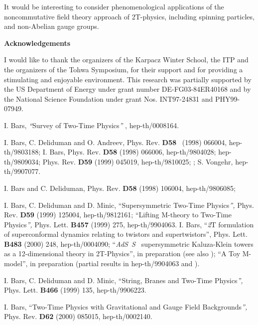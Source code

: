 \documentclass[a4paper,12pt]{article}
\begin{document}
It would be interesting to consider phenomenological applications of the
noncommutative field theory approach of 2T-physics, including spinning
particles, and non-Abelian gauge groups.

\bigskip

{\bf Acknowledgements}
\medskip

I would like to thank the organizers of the Karpacz Winter School,
the ITP and the organizers of the Tohwa Symposium, for their
support and for providing a stimulating and enjoyable environment.
This research was partially supported by the US Department of
Energy under grant number DE-FG03-84ER40168 and by the National
Science Foundation under grant Nos. INT97-24831 and PHY99-07949.

\begin{thebibliography}{99}
  I. Bars, \textit{``}Survey of Two-Time Physics\textit{''}
, hep-th/0008164.

  I. Bars, C. Deliduman and O. Andreev, Phys. Rev. \textbf{D58%
} \ (1998) 066004, hep-th/9803188; I. Bars, Phys. Rev.
\textbf{D58} (1998) 066006, hep-th/9804028; hep-th/9809034; Phys.
Rev. \textbf{D59} (1999) 045019, hep-th/9810025; ; S. Vongehr,
hep-th/9907077.

  I. Bars and C. Deliduman, Phys. Rev. \textbf{D58} (1998)
106004, hep-th/9806085;

  I. Bars, C. Deliduman and D. Minic, ``Supersymmetric
Two-Time Physics\textit{'', }Phys. Rev. \textbf{D59} (1999)
125004, hep-th/9812161; ``Lifting M-theory to Two-Time
Physics\textit{'', }Phys. Lett. \textbf{B457} (1999) 275,
hep-th/9904063. \newline I. Bars, ``\textit{2}T formulation of
superconformal dynamics relating to twistors and supertwistors'',
Phys. Lett. \textbf{B483 }(2000) 248, hep-th/0004090;
``\textit{AdS}\coordHE{}\textit{\ S}\coordHE{}\textit{\ }
supersymmetric Kaluza-Klein towers as a 12-dimensional theory in
2T-Physics'', in preparation (see also \cite{survey2T}); ``A Toy
M-model'', in preparation (partial results in hep-th/9904063 and
\cite{survey2T}).

  I. Bars, C. Deliduman and D. Minic, ``String, Branes and
Two-Time Physics\textit{'', }Phys. Lett. \textbf{B466} (1999) 135,
hep-th/9906223.

  I. Bars, ``Two-Time Physics with Gravitational and Gauge
Field Backgrounds\textit{'', }Phys. Rev. \textbf{D62} (2000) 085015,
hep-th/0002140.


\end{thebibliography}
\end{document}
